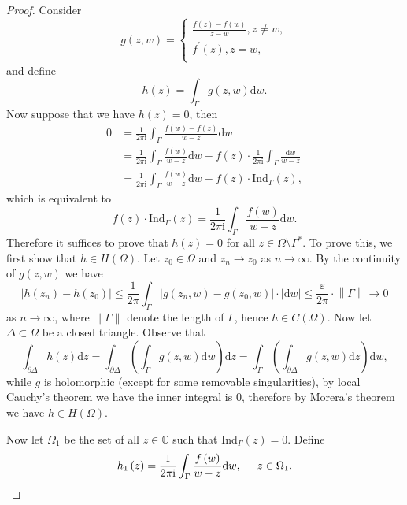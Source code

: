 \begin{proof}
Consider 
$$
g\left( z,w \right) =\begin{cases}
	\frac{f\left( z \right) -f\left( w \right)}{z-w},z\ne w,\\
	f^{\prime}\left( z \right) ,z=w,\\
\end{cases}
$$
and define 
$$
h\left( z \right) =\int_{\Gamma}{g\left( z,w \right) \mathrm{d}w}.
$$
Now suppose that we have $h(z)=0$, then 
$$
\begin{aligned}
0&=\frac{1}{2\pi \mathrm{i}}\int_{\Gamma}{\frac{f\left( w \right) -f\left( z \right)}{w-z}\mathrm{d}w}
\\
&=\frac{1}{2\pi \mathrm{i}}\int_{\Gamma}{\frac{f\left( w \right)}{w-z}\mathrm{d}w}-f\left( z \right) \cdot \frac{1}{2\pi \mathrm{i}}\int_{\Gamma}{\frac{\mathrm{d}w}{w-z}}
\\
&=\frac{1}{2\pi \mathrm{i}}\int_{\Gamma}{\frac{f\left( w \right)}{w-z}\mathrm{d}w}-f\left( z \right) \cdot \mathrm{Ind}_{\Gamma}\left( z \right) ,
\end{aligned}
$$
which is equivalent to 
$$
f\left( z \right) \cdot \mathrm{Ind}_{\Gamma}\left( z \right) =\frac{1}{2\pi \mathrm{i}}\int_{\Gamma}{\frac{f\left( w \right)}{w-z}\mathrm{d}w}.
$$
Therefore it suffices to prove that $h(z)=0$ for all $z\in\Omega\setminus\Gamma^*$. To prove this, we first show that $h\in H(\Omega)$. Let $z_0\in\Omega$ and $z_n\to z_0$ as $n\to\infty$. By the continuity of $g(z,w)$ we have 
$$
\left| h\left( z_n \right) -h\left( z_0 \right) \right|\le \frac{1}{2\pi}\int_{\Gamma}{\left| g\left( z_n,w \right) -g\left( z_0,w \right) \right|\cdot \left| \mathrm{d}w \right|}\le \frac{\varepsilon}{2\pi}\cdot \left\| \Gamma \right\| \rightarrow 0
$$
as $n\to\infty$, where $\|\Gamma\|$ denote the length of $\Gamma$, hence $h\in C(\Omega)$. Now let $\Delta\subset\Omega$ be a closed triangle. Observe that 
$$
\int_{\partial \Delta}{h\left( z \right) \mathrm{d}z}=\int_{\partial \Delta}{\left( \int_{\Gamma}{g\left( z,w \right) \mathrm{d}w} \right) \mathrm{d}z}=\int_{\Gamma}{\left( \int_{\partial \Delta}{g\left( z,w \right) \mathrm{d}z} \right) \mathrm{d}w},
$$
while $g$ is holomorphic (except for some removable singularities), by local Cauchy's theorem we have the inner integral is $0$, therefore by Morera's theorem we have $h\in H(\Omega)$.\par
Now let $\Omega_1$ be the set of all $z\in\mathbb{C}$ such that $\mathrm{Ind}_\Gamma(z)=0$. Define 
$$
h_1\left( z \right) =\frac{1}{2\pi \mathrm{i}}\int_{\Gamma}{\frac{f\left( w \right)}{w-z}\mathrm{d}w},\hspace{0.5cm}z\in \Omega _1.
$$
\end{proof}
